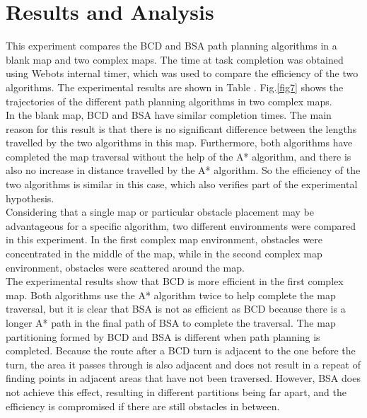 \documentclass[conference]{IEEEtran}
\begin{document}
\section{Results and Analysis}
This experiment compares the BCD and BSA path planning algorithms in a blank map and two complex maps. The time at task completion was obtained using Webots internal timer, which was used to compare the efficiency of the two algorithms. The experimental results are shown in Table \uppercase\expandafter{}. Fig.\ref{fig7} shows the trajectories of the different path planning algorithms in two complex maps.\\
In the blank map, BCD and BSA have similar completion times. The main reason for this result is that there is no significant difference between the lengths travelled by the two algorithms in this map. Furthermore, both algorithms have completed the map traversal without the help of the A* algorithm, and there is also no increase in distance travelled by the A* algorithm. So the efficiency of the two algorithms is similar in this case, which also verifies part of the experimental hypothesis.\\
Considering that a single map or particular obstacle placement may be advantageous for a specific algorithm, two different environments were compared in this experiment. In the first complex map environment, obstacles were concentrated in the middle of the map, while in the second complex map environment, obstacles were scattered around the map.\\
The experimental results show that BCD is more efficient in the first complex map. Both algorithms use the A* algorithm twice to help complete the map traversal, but it is clear that BSA is not as efficient as BCD because there is a longer A* path in the final path of BSA to complete the traversal. The map partitioning formed by BCD and BSA is different when path planning is completed. Because the route after a BCD turn is adjacent to the one before the turn, the area it passes through is also adjacent and does not result in a repeat of finding points in adjacent areas that have not been traversed. However, BSA does not achieve this effect, resulting in different partitions being far apart, and the efficiency is compromised if there are still obstacles in between.\\
\end{document}
